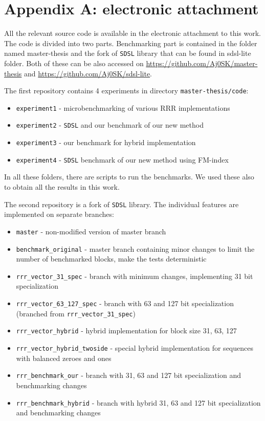 \chapter*{Appendix A: electronic attachment}
\label{kap:kapAppendixA}

All the relevant source code is available in the electronic attachment to this work.
The code is divided into two parts. Benchmarking part is contained in the folder named
master-thesis and the fork of \texttt{SDSL} library that can be found in sdsl-lite folder.
Both of these can be also accessed on \url{https://github.com/Aj0SK/master-thesis} and
\url{https://github.com/Aj0SK/sdsl-lite}.

The first repository contains 4 experiments in directory \texttt{master-thesis/code}:
\begin{itemize}
    \item \texttt{experiment1} - microbenchmarking of various RRR implementations
    \item \texttt{experiment2} - \texttt{SDSL} and our benchmark of our new method
    \item \texttt{experiment3} - our benchmark for hybrid implementation
    \item \texttt{experiment4} - \texttt{SDSL} benchmark of our new method using FM-index
\end{itemize}
In all these folders, there are scripts to run the benchmarks. We used these also to obtain
all the results in this work. 

The second repository is a fork of \texttt{SDSL} library. The individual features are implemented
on separate branches:
\begin{itemize}
    \item \texttt{master} - non-modified version of master branch
    \item \texttt{benchmark\_original} - master branch containing minor changes
        to limit the number of benchmarked blocks, make the tests deterministic
    \item \texttt{rrr\_vector\_31\_spec} - branch with minimum changes, implementing 31 bit specialization
    \item \texttt{rrr\_vector\_63\_127\_spec} - branch with 63 and 127 bit specialization (branched from \texttt{rrr\_vector\_31\_spec})
    \item \texttt{rrr\_vector\_hybrid} - hybrid implementation for block size 31, 63, 127
    \item \texttt{rrr\_vector\_hybrid\_twoside} - special hybrid implementation for sequences with balanced zeroes and ones
    \item \texttt{rrr\_benchmark\_our} - branch with 31, 63 and 127 bit specialization and benchmarking changes
    \item \texttt{rrr\_benchmark\_hybrid} - branch with hybrid 31, 63 and 127 bit specialization and benchmarking changes
\end{itemize}
